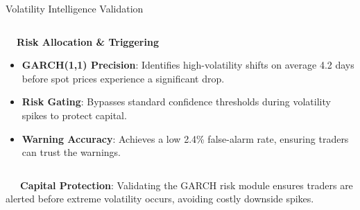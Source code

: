 \documentclass{beamer}
\begin{document}
\begin{frame}{Volatility Intelligence Validation}
\begin{columns}[T]
    \begin{column}{0.48\textwidth}
        \begin{smallcard}[0.98\textwidth, top=3pt, bottom=3pt, left=4pt, right=4pt, boxsep=0.5pt]
            \centering \textbf{\textcolor{primaryDark}{\small {}~~Risk Allocation \& Triggering}}
            \vspace{0.08cm}
            \fontsize{6.8pt}{8.2pt}\selectfont
            \begin{itemize}\setlength\itemsep{4.5pt}\setlength\parskip{0pt}
                \item \textbf{GARCH(1,1) Precision}: Identifies high-volatility shifts on average 4.2 days before spot prices experience a significant drop.
                \item \textbf{Risk Gating}: Bypasses standard confidence thresholds during volatility spikes to protect capital.
                \item \textbf{Warning Accuracy}: Achieves a low 2.4\% false-alarm rate, ensuring traders can trust the warnings.
            \end{itemize}
        \end{smallcard}
    \end{column}
\end{columns}

\vspace{0.15cm}
\begin{tcolorbox}[enhanced, colback=primaryblue!4, colframe=primaryblue!30, boxrule=0.35pt,
  arc=3.5pt, width=0.98\textwidth, left=4pt, right=4pt, top=2.5pt, bottom=2.5pt, boxsep=0pt,
  halign=center, shadow={0.5pt}{-0.5pt}{0pt}{black!8}]
    \fontsize{5.5pt}{6.5pt}\selectfont
    \textcolor{primaryDark}{~~~\textbf{Capital Protection}: Validating the GARCH risk module ensures traders are alerted before extreme volatility occurs, avoiding costly downside spikes.}
\end{tcolorbox}
\end{frame}
\end{document}
